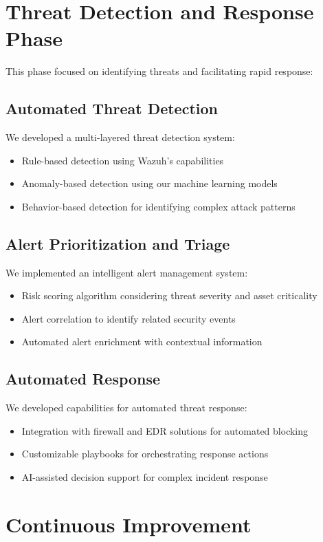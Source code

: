 \section{Threat Detection and Response Phase}

This phase focused on identifying threats and facilitating rapid response:

\subsection{Automated Threat Detection}
We developed a multi-layered threat detection system:
\begin{itemize}
    \item Rule-based detection using Wazuh's capabilities
    \item Anomaly-based detection using our machine learning models
    \item Behavior-based detection for identifying complex attack patterns
\end{itemize}

\subsection{Alert Prioritization and Triage}
We implemented an intelligent alert management system:
\begin{itemize}
    \item Risk scoring algorithm considering threat severity and asset criticality
    \item Alert correlation to identify related security events
    \item Automated alert enrichment with contextual information
\end{itemize}

\subsection{Automated Response}
We developed capabilities for automated threat response:
\begin{itemize}
    \item Integration with firewall and EDR solutions for automated blocking
    \item Customizable playbooks for orchestrating response actions
    \item AI-assisted decision support for complex incident response
\end{itemize}

\section{Continuous Improvement}

